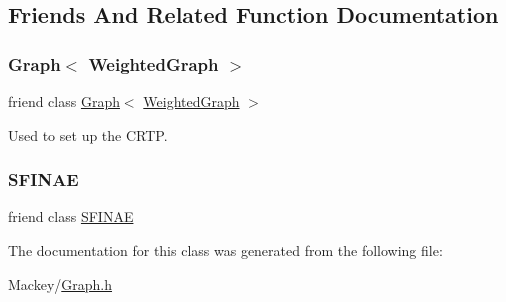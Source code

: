\subsection{Friends And Related Function Documentation}
\mbox{\label{classMackey_1_1WeightedGraph_aa4863e14b8d7dcd76942894cae55e453}} 
\subsubsection{\texorpdfstring{Graph$<$ Weighted\+Graph $>$}{Graph< WeightedGraph >}}
{\footnotesize\ttfamily friend class \hyperlink{classMackey_1_1Graph}{Graph}$<$ \hyperlink{classMackey_1_1WeightedGraph}{Weighted\+Graph} $>$\hspace{0.3cm}{\ttfamily [friend]}}



Used to set up the C\+R\+TP. 

\mbox{\label{classMackey_1_1WeightedGraph_a4a5a1a2093897e5ce4cabec8f82f5c9c}} 
\subsubsection{\texorpdfstring{S\+F\+I\+N\+AE}{SFINAE}}
{\footnotesize\ttfamily friend class \hyperlink{structMackey_1_1SFINAE}{S\+F\+I\+N\+AE}\hspace{0.3cm}{\ttfamily [friend]}}



The documentation for this class was generated from the following file\+:\begin{DoxyCompactItemize}
\item 
Mackey/\hyperlink{Graph_8h}{Graph.\+h}\end{DoxyCompactItemize}
